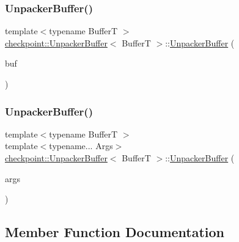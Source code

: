 \subsubsection{\texorpdfstring{Unpacker\+Buffer()}{UnpackerBuffer()}\hspace{0.1cm}{\footnotesize\ttfamily [1/2]}}
{\footnotesize\ttfamily template$<$typename BufferT $>$ \\
\hyperlink{structcheckpoint_1_1_unpacker_buffer}{checkpoint\+::\+Unpacker\+Buffer}$<$ BufferT $>$\+::\hyperlink{structcheckpoint_1_1_unpacker_buffer}{Unpacker\+Buffer} (\begin{DoxyParamCaption}\item[{\hyperlink{namespacecheckpoint_ae57f01cdc0b81776c23b6c7c934c58f5}{Serial\+Byte\+Type} $\ast$}]{buf }\end{DoxyParamCaption})\hspace{0.3cm}{\ttfamily [explicit]}}

\mbox{\label{structcheckpoint_1_1_unpacker_buffer_a29ae9066bbc8f43a660d1e0b0163dd44}} 
\subsubsection{\texorpdfstring{Unpacker\+Buffer()}{UnpackerBuffer()}\hspace{0.1cm}{\footnotesize\ttfamily [2/2]}}
{\footnotesize\ttfamily template$<$typename BufferT $>$ \\
template$<$typename... Args$>$ \\
\hyperlink{structcheckpoint_1_1_unpacker_buffer}{checkpoint\+::\+Unpacker\+Buffer}$<$ BufferT $>$\+::\hyperlink{structcheckpoint_1_1_unpacker_buffer}{Unpacker\+Buffer} (\begin{DoxyParamCaption}\item[{Args \&\&...}]{args }\end{DoxyParamCaption})\hspace{0.3cm}{\ttfamily [explicit]}}



\subsection{Member Function Documentation}
\mbox{\label{structcheckpoint_1_1_unpacker_buffer_af771af2cb7b14b35f13a1f4605a73148}} 
